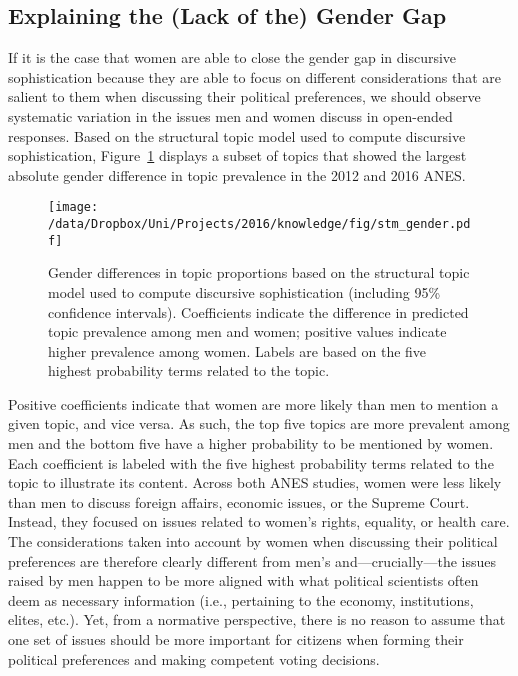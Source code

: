 \subsection*{Explaining the (Lack of the) Gender Gap}
If it is the case that women are able to close the gender gap in discursive sophistication because they are able to focus on different considerations that are salient to them when discussing their political preferences, we should observe systematic variation in the issues men and women discuss in open-ended responses. Based on the structural topic model used to compute discursive sophistication, Figure~\ref{fig:stm_gender} displays a subset of topics that showed the largest absolute gender difference in topic prevalence in the 2012 and 2016 ANES.

\begin{figure}[h]\centering
\texttt{[image: /data/Dropbox/Uni/Projects/2016/knowledge/fig/stm\_gender.pdf]}
\caption{Gender differences in topic proportions based on the structural topic model used to compute discursive sophistication (including 95\% confidence intervals). Coefficients indicate the difference in predicted topic prevalence among men and women; positive values indicate higher prevalence among women. Labels are based on the five highest probability terms related to the topic.
}\label{fig:stm_gender}
\end{figure}

Positive coefficients indicate that women are more likely than men to mention a given topic, and vice versa. As such, the top five topics are more prevalent among men and the bottom five have a higher probability to be mentioned by women. Each coefficient is labeled with the five highest probability terms related to the topic to illustrate its content. Across both ANES studies, women were less likely than men to discuss foreign affairs, economic issues, or the Supreme Court. Instead, they focused on issues related to women's rights, equality, or health care. The considerations taken into account by women when discussing their political preferences are therefore clearly different from men's and---crucially---the issues raised by men happen to be more aligned with what political scientists often deem as necessary information (i.e., pertaining to the economy, institutions, elites, etc.). Yet, from a normative perspective, there is no reason to assume that one set of issues should be more important for citizens when forming their political preferences and making competent voting decisions.




